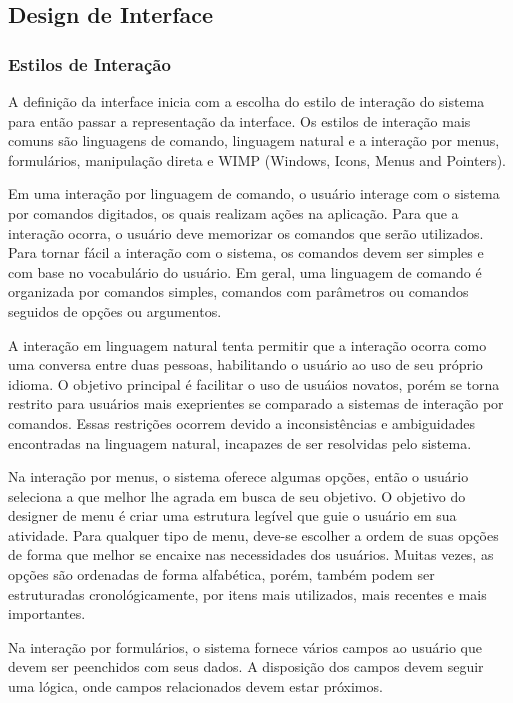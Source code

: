 	\subsection{Design de Interface}
	
		\subsubsection{Estilos de Interação}
A definição da interface inicia com a escolha do estilo de interação do sistema
para então passar a representação da interface.	Os estilos de interação mais
comuns são linguagens de comando, linguagem natural e a interação por menus,
formulários, manipulação direta e WIMP (Windows, Icons, Menus and Pointers).


	Em uma interação por linguagem de comando, o usuário interage com o sistema
por comandos digitados, os quais realizam ações na aplicação. Para que a
interação ocorra, o usuário deve memorizar os comandos que serão utilizados.
Para tornar fácil a interação com o sistema, os comandos devem ser simples e com
base no vocabulário do usuário. Em geral, uma linguagem de comando é organizada
por comandos simples, comandos com parâmetros ou comandos seguidos de opções ou
argumentos.


	A interação em linguagem natural tenta permitir que a interação ocorra como
uma conversa entre duas pessoas, habilitando o usuário ao uso de seu próprio
idioma. O objetivo principal é facilitar o uso de usuáios novatos, porém se
torna restrito para usuários mais exeprientes se comparado a sistemas de
interação por comandos. Essas restrições ocorrem devido a inconsistências e
ambiguidades encontradas na linguagem natural, incapazes de ser resolvidas pelo
sistema.


	Na interação por menus, o sistema oferece algumas opções, então o usuário
seleciona a que melhor lhe agrada em busca de seu objetivo. O objetivo do
designer de menu é criar uma estrutura legível que guie o usuário em sua
atividade. Para qualquer tipo de menu, deve-se escolher a ordem de suas opções
de forma que melhor se encaixe nas necessidades dos usuários. Muitas vezes, as
opções são ordenadas de forma alfabética, porém, também podem ser estruturadas
cronológicamente, por itens mais utilizados, mais recentes e mais importantes.
	
Na interação por formulários, o sistema fornece vários campos ao usuário que
devem ser peenchidos com seus dados. A disposição dos campos devem seguir uma
lógica, onde campos relacionados devem estar próximos.

